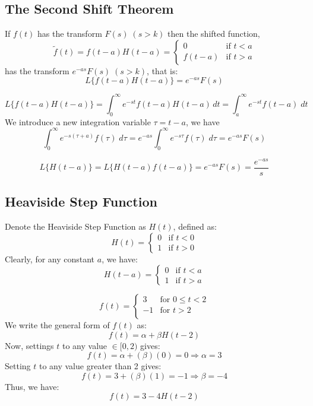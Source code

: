 \documentclass[a4paper, 10pt]{article}
\begin{document}
\pagebreak

\subsection{The Second Shift Theorem}
\begin{theorembox}
  If $f(t)$ has the transform $F(s) \; (s > k)$ then the shifted function, 
  $$
  \tilde{f}(t) = f(t-a)H(t-a) = \begin{cases}
    0 & \text{if } t < a \\
    f(t-a) & \text{if } t > a
  \end{cases}
  $$
  has the transform $e^{-as}F(s)\; (s > k)$, that is:
  $$L\{f(t-a)H(t-a)\} = e^{-as}F(s)$$
\end{theorembox}

\begin{proofbox}
  $$L\{f(t-a)H(t-a)\} = \int_0^\infty e^{-st}f(t-a)H(t-a)\, dt = \int_a^\infty e^{-st}f(t-a)\;dt$$
  We introduce a new integration variable $\tau = t-a$, we have
  $$\int_0^\infty e^{-s(\tau + a)}f(\tau)\;d\tau = e^{-as}\int_0^\infty e^{-s\tau}f(\tau)\;d\tau = e^{-as}F(s)$$
\end{proofbox}

\begin{examplebox}
  $$L\{H(t-a)\} = L\{H(t-a)f(t-a)\} = e^{-as}F(s) = \dfrac{e^{-as}}{s}$$
\end{examplebox}

\subsection{Heaviside Step Function}
Denote the Heaviside Step Function as $H(t)$, defined as:
$$
H(t) = \begin{cases}
0 & \text{if } t < 0 \\
1 & \text{if } t > 0
\end{cases}
$$
Clearly, for any constant $a$, we have:
$$
H(t-a) = \begin{cases}
0 & \text{if } t < a \\
1 & \text{if } t > a
\end{cases}
$$

\begin{examplebox}
  $$f(t) = \begin{cases}
    3 & \text{for } 0 \leq t < 2 \\
    -1 & \text{for } t > 2 \\
  \end{cases}$$
  We write the general form of $f(t)$ as:
  $$f(t) = \alpha + \beta H(t-2)$$
  Now, settings $t$ to any value $\in [0,2)$ gives:
  $$f(t) = \alpha + (\beta)(0) = 0 \Rightarrow \alpha = 3$$
  Setting $t$ to any value greater than 2 gives:
  $$f(t) = 3 + (\beta)(1) = -1 \Rightarrow \beta = -4 $$
  Thus, we have:
  $$f(t) = 3 - 4H(t-2)$$
\end{examplebox}
\end{document}

